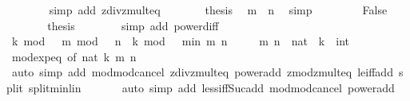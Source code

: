 \begin{isabellebody}
\ \ \ \ \ \ \isamarkupfalse%
\ {\isacharparenleft}{\kern0pt}simp\ add{\isacharcolon}{\kern0pt}\ zdiv{\isacharunderscore}{\kern0pt}zmult{}{\isacharunderscore}{\kern0pt}eq{\isacharparenright}{\kern0pt}\isanewline
\ \ \ \ \isamarkupfalse%
\ \isamarkupfalse%
\ {\isacharquery}{\kern0pt}thesis\ \isamarkupfalse%
\ {\isacartoucheopen}m\ {\isacharless}{\kern0pt}\ n{\isacartoucheclose}\ \isamarkupfalse%
\ simp\isanewline
\ \ \isamarkupfalse%
\isanewline
\ \ \ \ \isamarkupfalse%
\ False\isanewline
\ \ \ \ \isamarkupfalse%
\ \isamarkupfalse%
\ {\isacharquery}{\kern0pt}thesis\isanewline
\ \ \ \ \ \ \isamarkupfalse%
\ {\isacharparenleft}{\kern0pt}simp\ add{\isacharcolon}{\kern0pt}\ power{\isacharunderscore}{\kern0pt}diff{\isacharparenright}{\kern0pt}\isanewline
\ \ \isamarkupfalse%
\isanewline
\ \ \isamarkupfalse%
\ {\isacartoucheopen}k\ mod\ {}\ {\isacharcircum}{\kern0pt}\ m\ mod\ {}\ {\isacharcircum}{\kern0pt}\ n\ {\isacharequal}{\kern0pt}\ k\ mod\ {}\ {\isacharcircum}{\kern0pt}\ min\ m\ n{\isacartoucheclose}\isanewline
\ \ \ \ \ m\ n\ {\isacharcolon}{\kern0pt}{\isacharcolon}{\kern0pt}\ nat\ \ k\ {\isacharcolon}{\kern0pt}{\isacharcolon}{\kern0pt}\ int\isanewline
\ \ \ \ \isamarkupfalse%
\ mod{\isacharunderscore}{\kern0pt}exp{\isacharunderscore}{\kern0pt}eq\ {\isacharbrackleft}{\kern0pt}of\ {\isacartoucheopen}nat\ k{\isacartoucheclose}\ m\ n{\isacharbrackright}{\kern0pt}\isanewline
\ \ \ \ \isamarkupfalse%
\ {\isacharparenleft}{\kern0pt}auto\ simp\ add{\isacharcolon}{\kern0pt}\ mod{\isacharunderscore}{\kern0pt}mod{\isacharunderscore}{\kern0pt}cancel\ zdiv{\isacharunderscore}{\kern0pt}zmult{}{\isacharunderscore}{\kern0pt}eq\ power{\isacharunderscore}{\kern0pt}add\ zmod{\isacharunderscore}{\kern0pt}zmult{}{\isacharunderscore}{\kern0pt}eq\ le{\isacharunderscore}{\kern0pt}iff{\isacharunderscore}{\kern0pt}add\ split{\isacharcolon}{\kern0pt}\ split{\isacharunderscore}{\kern0pt}min{\isacharunderscore}{\kern0pt}lin{\isacharparenright}{\kern0pt}\isanewline
\ \ \ \ \ \isamarkupfalse%
\ {\isacharparenleft}{\kern0pt}auto\ simp\ add{\isacharcolon}{\kern0pt}\ less{\isacharunderscore}{\kern0pt}iff{\isacharunderscore}{\kern0pt}Suc{\isacharunderscore}{\kern0pt}add\ mod{\isacharunderscore}{\kern0pt}mod{\isacharunderscore}{\kern0pt}cancel\ power{\isacharunderscore}{\kern0pt}add{\isacharparenright}{\kern0pt}\isanewline

\end{isabellebody}
